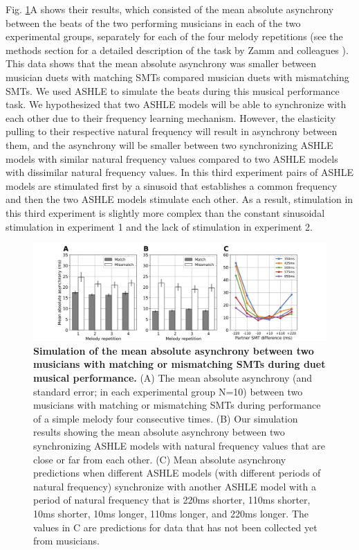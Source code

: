 \documentclass{report}
\begin{document}
Fig.{} \ref{f3_4}A shows their results, which consisted of the mean absolute asynchrony between the beats of the two performing musicians in each of the two experimental groups, separately for each of the four melody repetitions (see the methods section for a detailed description of the task by Zamm and colleagues \cite{zamm2016endogenous}). This data shows that the mean absolute asynchrony was smaller between musician duets with matching SMTs compared musician duets with mismatching SMTs. We used ASHLE to simulate the beats during this musical performance task. We hypothesized that two ASHLE models will be able to synchronize with each other due to their frequency learning mechanism. However, the elasticity pulling to their respective natural frequency will result in asynchrony between them, and the asynchrony will be smaller between two synchronizing ASHLE models with similar natural frequency values compared to two ASHLE models with dissimilar natural frequency values. In this third experiment pairs of ASHLE models are stimulated first by a sinusoid that establishes a common frequency and then the two ASHLE models stimulate each other. As a result, stimulation in this third experiment is slightly more complex than the constant sinusoidal stimulation in experiment 1 and the lack of stimulation in experiment 2.

\begin{figure}
    \centering
    \includegraphics[width=1.0\textwidth]{figures/fig3_4.png}
    \caption[Simulation of the mean absolute asynchrony between two musicians with matching or mismatching SMTs during duet musical performance]{\textbf{Simulation of the mean absolute asynchrony between two musicians with matching or mismatching SMTs during duet musical performance.} (A) The mean absolute asynchrony (and standard error; in each experimental group N=10) between two musicians with matching or mismatching SMTs during performance of a simple melody four consecutive times. (B) Our simulation results showing the mean absolute asynchrony between two synchronizing ASHLE models with natural frequency values that are close or far from each other. (C) Mean absolute asynchrony predictions when different ASHLE models (with different periods of natural frequency) synchronize with another ASHLE model with a period of natural frequency that is 220ms shorter, 110ms shorter, 10ms shorter, 10ms longer, 110ms longer, and 220ms longer. The values in C are predictions for data that has not been collected yet from musicians.}
    \label{f3_4}
\end{figure}
\end{document}
